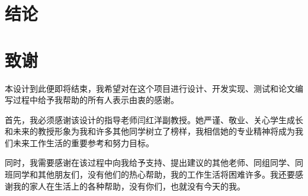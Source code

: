 \newpage
\section{结论}

\printbibliography[heading=bibintoc]

\section*{致谢}

本设计到此便即将结束，我希望对在这个项目进行设计、开发实现、测试和论文编写过程中给予我帮助的所有人表示由衷的感谢。

首先，我必须感谢该设计的指导老师闫红洋副教授。她严谨、敬业、关心学生成长和未来的教授形象为我和许多其他同学树立了榜样，我相信她的专业精神将成为我们未来工作生活的重要参考和努力目标。

同时，我需要感谢在该过程中向我给予支持、提出建议的其他老师、同组同学、同班同学和其他朋友们，没有他们的热心帮助，我的工作生活将困难许多。我还要感谢我的家人在生活上的各种帮助，没有你们，也就没有今天的我。